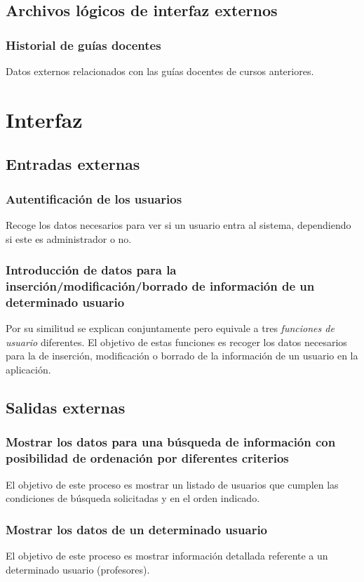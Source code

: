 \documentclass[11pt,a4paper,spanish,twoside]{book}
\begin{document}
\subsection{Archivos lógicos de interfaz externos}
\subsubsection{Historial de guías docentes}
Datos externos relacionados con las guías docentes de cursos anteriores. 
 
\section{Interfaz}
\subsection{Entradas externas}
\subsubsection{Autentificación de los usuarios}
Recoge los datos necesarios para ver si un usuario entra al sistema,
dependiendo si este es administrador o no.

\subsubsection{Introducción de datos para la inserción/modificación/borrado 
de información de un determinado usuario}
Por su similitud se explican conjuntamente pero equivale a tres
\emph{funciones de usuario} diferentes. El objetivo de estas funciones es
recoger los datos necesarios para la de inserción, modificación o borrado de
la información de un usuario en la aplicación.

\subsection{Salidas externas}
\subsubsection{Mostrar los datos para una búsqueda de información con
  posibilidad de ordenación por diferentes criterios}
El objetivo de este proceso es mostrar un listado de usuarios que cumplen las
condiciones de búsqueda solicitadas y en el orden indicado.

\subsubsection{Mostrar los datos de un determinado usuario}
El objetivo de este proceso es mostrar información detallada referente a un
determinado usuario (profesores).
\end{document}
